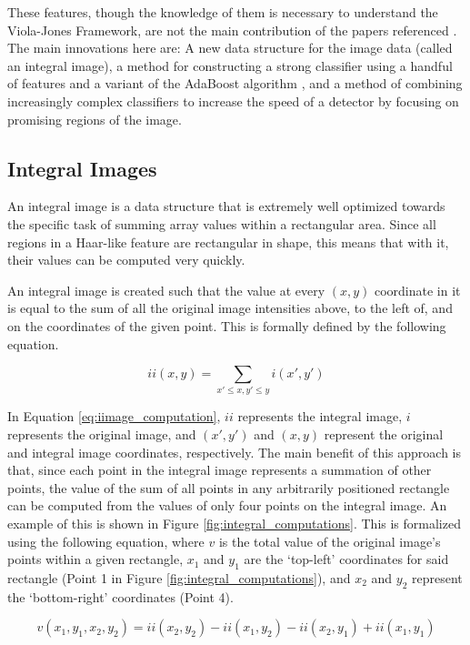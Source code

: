\documentclass[11pt,a4paper,oldfontcommands]{memoir}
\begin{document}
These features, though the knowledge of them is necessary to understand the Viola-Jones Framework, are not the main contribution of the papers referenced \cite{viola}\cite{viola_updated}. The main innovations here are: A new data structure for the image data (called an integral image), a method for constructing a strong classifier using a handful of features and a variant of the AdaBoost algorithm \cite{adaboost}, and a method of combining increasingly complex classifiers to increase the speed of a detector by focusing on promising regions of the image. 

\subsection{Integral Images}
\label{ss:iimage}
An integral image is a data structure that is extremely well optimized towards the specific task of summing array values within a rectangular area. Since all regions in a Haar-like feature are rectangular in shape, this means that with it, their values can be computed very quickly.

An integral image is created such that the value at every $(x,y)$ coordinate in it is equal to the sum of all the original image intensities above, to the left of, and on the coordinates of the given point. This is formally defined by the following equation.

\begin{equation}
    ii(x,y) = \sum_{x' \leq x, y'\leq y}i(x', y')
    \label{eq:iimage_computation}
\end{equation}

In Equation \ref{eq:iimage_computation}, $ii$ represents the integral image, $i$ represents the original image, and $(x', y')$ and $(x, y)$ represent the original and integral image coordinates, respectively. The main benefit of this approach is that, since each point in the integral image represents a summation of other points, the value of the sum of all points in any arbitrarily positioned rectangle can be computed from the values of only four points on the integral image. An example of this is shown in Figure \ref{fig:integral_computations}. This is formalized using the following equation, where $v$ is the total value of the original image's points within a given rectangle, $x_1$ and $y_1$ are the `top-left' coordinates for said rectangle (Point 1 in Figure \ref{fig:integral_computations}), and $x_2$ and $y_2$ represent the `bottom-right' coordinates (Point 4).

\begin{equation}
    v(x_1, y_1, x_2, y_2) = ii(x_2, y_2) - ii(x_1, y_2) - ii(x_2, y_1) + ii(x_1, y_1)
    \label{eq:iimage_rect}
\end{equation}
\end{document}
